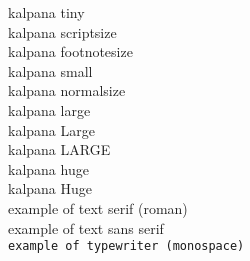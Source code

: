 \documentclass{report}
\begin{document}
\tiny{kalpana tiny }\\
\scriptsize{kalpana scriptsize}\\
\footnotesize{kalpana footnotesize}\\
\small{kalpana small }\\
\normalsize{kalpana normalsize }\\
\large{kalpana large }\\
\Large{kalpana Large}\\
\LARGE{kalpana LARGE }\\
\huge{kalpana huge }\\
\Huge{kalpana Huge}\\

\textrm{example of text serif (roman)}\\
\textsf{example of  text sans serif}\\
\texttt{example of typewriter (monospace) }\\
\end{document}
